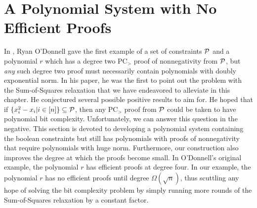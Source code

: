 \section{A Polynomial System with No Efficient Proofs}
In \cite{ODon16}, Ryan O'Donnell gave the first example of a set of constraints $\mathcal P$ and a polynomial $r$ which has a degree two PC$_>$ proof of nonnegativity from $\mathcal P$, but \emph{any} such degree two proof must necessarily contain polynomials with doubly exponential norm. In his paper, he was the first to point out the problem with the Sum-of-Squares relaxation that we have endeavored to alleviate in this chapter. He conjectured several possible positive results to aim for. He hoped that if $\{x_i^2 - x_i | i \in [n]\} \subseteq \mathcal P$, then any PC$_>$ proof from $\mathcal P$ could be taken to have polynomial bit complexity. Unfortunately, we can answer this question in the negative. This section is devoted to developing a polynomial system containing the boolean constraints but still has polynomials with proofs of nonnegativity that require polynomials with huge norm. Furthermore, our construction also improves the degree at which the proofs become small. In O'Donnell's original example, the polynomial $r$ has efficient proofs at degree four. In our example, the polynomial $r$ has no efficient proofs until degree $\Omega(\sqrt{n})$, thus scuttling any hope of solving the bit complexity problem by simply running more rounds of the Sum-of-Squares relaxation by a constant factor.

